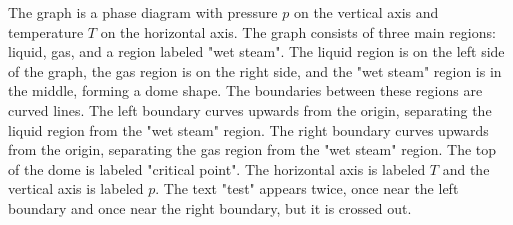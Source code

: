 The graph is a phase diagram with pressure \( p \) on the vertical axis and temperature \( T \) on the horizontal axis. The graph consists of three main regions: liquid, gas, and a region labeled "wet steam". The liquid region is on the left side of the graph, the gas region is on the right side, and the "wet steam" region is in the middle, forming a dome shape. The boundaries between these regions are curved lines. The left boundary curves upwards from the origin, separating the liquid region from the "wet steam" region. The right boundary curves upwards from the origin, separating the gas region from the "wet steam" region. The top of the dome is labeled "critical point". The horizontal axis is labeled \( T \) and the vertical axis is labeled \( p \). The text "test" appears twice, once near the left boundary and once near the right boundary, but it is crossed out.